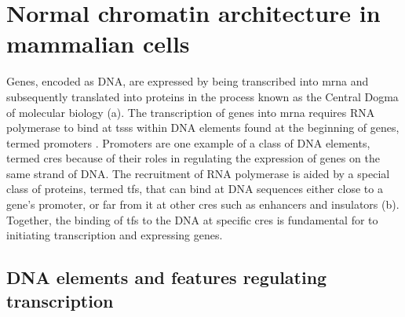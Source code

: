 \section{Normal chromatin architecture in mammalian cells}

Genes, encoded as DNA, are expressed by being transcribed into \gls{mrna} and subsequently translated into proteins in the process known as the Central Dogma of molecular biology \cite{albertsMolecularBiologyCell2015} (a).
The transcription of genes into \gls{mrna} requires RNA polymerase to bind at \glspl{tss} within DNA elements found at the beginning of genes, termed promoters \cite{goodrichUnexpectedRolesCore2010}.
Promoters are one example of a class of DNA elements, termed \glspl{cre} because of their roles in regulating the expression of genes on the same strand of DNA.
The recruitment of RNA polymerase is aided by a special class of proteins, termed \glspl{tf}, that can bind at DNA sequences either close to a gene's promoter, or far from it at other \glspl{cre} such as enhancers and insulators \cite{schoenfelderLongrangeEnhancerPromoter2019,spitzTranscriptionFactorsEnhancer2012,ongEnhancerFunctionNew2011,anderssonDeterminantsEnhancerPromoter2020,gasznerInsulatorsExploitingTranscriptional2006,oudelaarRelationshipGenomeStructure2020} (b).
Together, the binding of \glspl{tf} to the DNA at specific \glspl{cre} is fundamental for to initiating transcription and expressing genes.

\subsection{DNA elements and features regulating transcription}

